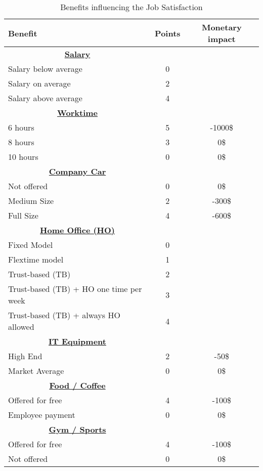 \begin{table}[]
    \centering
\begin{tabular}{l|c|c}
    \hline
     \textbf{Benefit} & \textbf{Points} & \textbf{Monetary impact} \\
     \hline \hline
     \multicolumn{1}{c|}{\underline{\textbf{Salary}}} & & \\
     Salary below average & 0 &  \\
     Salary on average & 2 &  \\
     Salary above average & 4 &   \\
     \hline
     \multicolumn{1}{c|}{\underline{\textbf{Worktime}}} & & \\
     6 hours & 5 & -1000\$  \\
     8 hours & 3 & 0\$  \\
     10 hours & 0 & 0\$  \\
     \hline
     \multicolumn{1}{c|}{\underline{\textbf{Company Car}}} & & \\
     Not offered & 0 & 0\$  \\
     Medium Size & 2 & -300\$  \\
     Full Size & 4 & -600\$  \\
     \hline
     \multicolumn{1}{c|}{\underline{\textbf{Home Office (HO)}}} & & \\
     Fixed Model & 0 &   \\
     Flextime model & 1 &   \\
     Trust-based (TB) & 2 &   \\
     Trust-based (TB) + HO one time per week & 3 &   \\
     Trust-based (TB) + always HO allowed & 4 &   \\
     \hline
     \multicolumn{1}{c|}{\underline{\textbf{IT Equipment}}} & & \\
     High End & 2 & -50\$  \\
     Market Average & 0 & 0\$  \\
     \hline
     \multicolumn{1}{c|}{\underline{\textbf{Food / Coffee}}} & & \\
     Offered for free & 4 & -100\$  \\
     Employee payment & 0 & 0\$  \\
     \hline
     \multicolumn{1}{c|}{\underline{\textbf{Gym / Sports}}} & & \\
     Offered for free & 4 & -100\$  \\
     Not offered & 0 & 0\$  \\
     \hline

\end{tabular}
\caption{Benefits influencing the Job Satisfaction}
    \label{tab:benefitsJSS}
\end{table}

